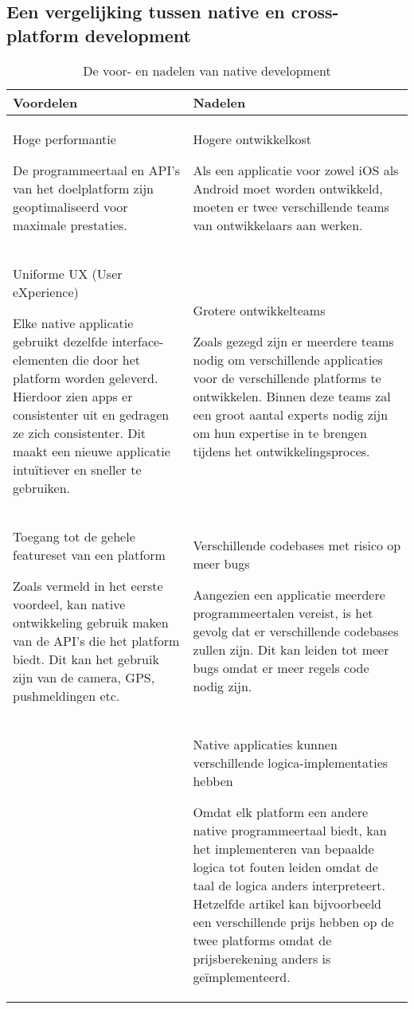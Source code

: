 \subsection{Een vergelijking tussen native en cross-platform development}
\begin{table}[H]
    \centering
    \begin{tabular}{|p{3.0in}|p{3.0in}|}
        \hline
            Voordelen & Nadelen 
            \\
        \hline
        \hline
        Hoge performantie
        
        De programmeertaal en API's van het doelplatform zijn geoptimaliseerd voor maximale prestaties.
            &
        Hogere ontwikkelkost
        
        Als een applicatie voor zowel iOS als Android moet worden ontwikkeld, moeten er twee verschillende teams van ontwikkelaars aan werken.
        \\\hline
        Uniforme UX (User eXperience)
        
        Elke native applicatie gebruikt dezelfde interface-elementen die door het platform worden geleverd. Hierdoor zien apps er consistenter uit en gedragen ze zich consistenter. Dit maakt een nieuwe applicatie intuïtiever en sneller te gebruiken.
            &
        Grotere ontwikkelteams
        
        Zoals gezegd zijn er meerdere teams nodig om verschillende applicaties voor de verschillende platforms te ontwikkelen. Binnen deze teams zal een groot aantal experts nodig zijn om hun expertise in te brengen tijdens het ontwikkelingsproces.
        \\\hline
        Toegang tot de gehele featureset van een platform
        
        Zoals vermeld in het eerste voordeel, kan native ontwikkeling gebruik maken van de API's die het platform biedt. Dit kan het gebruik zijn van de camera, GPS, pushmeldingen etc.
            &
        Verschillende codebases met risico op meer bugs
        
        Aangezien een applicatie meerdere programmeertalen vereist, is het gevolg dat er verschillende codebases zullen zijn.
        Dit kan leiden tot meer bugs omdat er meer regels code nodig zijn.
        \\\hline
        
            &
        Native applicaties kunnen verschillende logica-implementaties hebben
        
        Omdat elk platform een andere native programmeertaal biedt, kan het implementeren van bepaalde logica tot fouten leiden omdat de taal de logica anders interpreteert.
        Hetzelfde artikel kan bijvoorbeeld een verschillende prijs hebben op de twee platforms omdat de prijsberekening anders is geïmplementeerd.
        \\\hline
    \end{tabular}
    \caption[De voor- en nadelen van native development]{De voor- en nadelen van native development \autocite{KotlinFoundation2023}}
    \label{tab:nativeDevelopmentTable}
\end{table}

